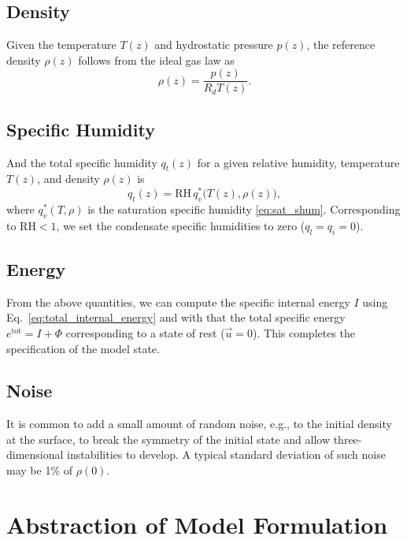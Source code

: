 \documentclass{report}
\begin{document}
\section{Density}
 
Given the temperature $T(z)$ and hydrostatic pressure $p(z)$, the reference density $\rho(z)$ follows from the ideal gas law as
\begin{equation}\label{eq:hydro_density}
    \rho(z) = \frac{p(z)}{R_d T(z)}.
\end{equation}

\section{Specific Humidity}

And the total specific humidity $q_t(z)$ for a given relative humidity, temperature $T(z)$, and density $\rho(z)$ is
\begin{equation}
    q_t(z) = \mathrm{RH} \, q_v^*\bigl( T(z), \rho(z) \bigr),
\end{equation}
where $q_v^*(T, \rho)$ is the saturation specific humidity \eqref{eq:sat_shum}. Corresponding to $\mathrm{RH} < 1$, we set the condensate specific humidities to zero ($q_l = q_i = 0$).

\section{Energy}

From the above quantities, we can compute the specific internal energy $I$ using Eq.~\eqref{eq:total_internal_energy} and with that the total specific energy $e^{\mathrm{tot}} = I + \Phi$ corresponding to a state of rest ($\vec{u}=0$). This completes the specification of the model state.

\section{Noise}

It is common to add a small amount of random noise, e.g., to the initial density at the surface, to break the symmetry of the initial state and allow three-dimensional instabilities to develop. A typical standard deviation of such noise may be 1\% of $\rho(0)$.

\chapter{Abstraction of Model Formulation}\label{s:abstract_model_formulation}
\end{document}
